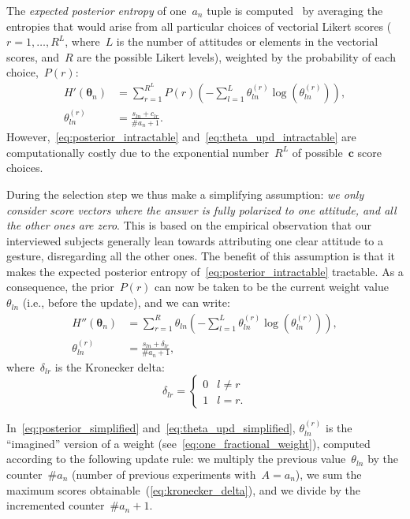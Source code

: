 The \emph{expected posterior entropy} of one~$a_n$ tuple is computed~\cite[Eq.~1]{tong:2000} by averaging the entropies that would arise from all particular choices of vectorial Likert scores ($r = 1,\ldots,R^L$, where~$L$ is the number of attitudes or elements in the vectorial scores, and~$R$ are the possible Likert levels), weighted by the probability of each choice,~$P(r)$:
\begin{align}
H'(\bm{\theta}_n) &= \sum_{r=1}^{R^L} P(r) \left( - \sum_{l=1}^L \theta_{ln}^{(r)} \log \left( \theta_{ln}^{(r)} \right) \right), \label{eq:posterior_intractable} \\
%
\theta_{ln}^{(r)} &= \frac{s_{ln} + c_{lr}}{\#a_n + 1}. \label{eq:theta_upd_intractable}
\end{align}
However,~\eqref{eq:posterior_intractable} and~\eqref{eq:theta_upd_intractable} are computationally costly due to the exponential number~$R^L$ of possible~$\bm{c}$ score choices.

During the selection step we thus make a simplifying assumption: \emph{we only consider score vectors where the answer is fully polarized to one attitude, and all the other ones are zero}. This is based on the empirical observation that our interviewed subjects generally lean towards attributing one clear attitude to a gesture, disregarding all the other ones. The benefit of this assumption is that it makes the expected posterior entropy of~\eqref{eq:posterior_intractable} tractable. As a consequence, the prior~$P(r)$ can now be taken to be the current weight value~$\theta_{ln}$ (i.e., before the update), and we can write:
\begin{align}
H''(\bm{\theta}_n) &= \sum_{r=1}^R \theta_{ln} \left( - \sum_{l=1}^L \theta_{ln}^{(r)} \log \left( \theta_{ln}^{(r)} \right) \right), \label{eq:posterior_simplified} \\
%
\theta_{ln}^{(r)} &= \frac{s_{ln} + \delta_{lr}}{\#a_n + 1}, \label{eq:theta_upd_simplified}
\end{align}
where~$\delta_{lr}$ is the Kronecker delta:
\begin{equation} \label{eq:kronecker_delta}
\delta_{lr} =
              \begin{cases}
              0 & l \neq r \\
              1 & l = r.
              \end{cases}
\end{equation}

In~\eqref{eq:posterior_simplified} and~\eqref{eq:theta_upd_simplified}, $\theta_{ln}^{(r)}$ is the ``imagined'' version of a weight (see~\eqref{eq:one_fractional_weight}), computed according to the following update rule: we multiply the previous value~$\theta_{ln}$ by the counter~$\#a_n$ (number of previous experiments with~$A=a_n$), we sum the maximum scores obtainable~(\eqref{eq:kronecker_delta}), and we divide by the incremented counter~$\#a_n + 1$.

